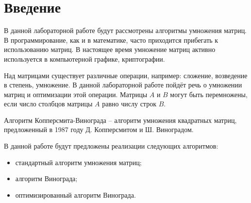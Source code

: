 \chapter*{Введение}

В данной лабораторной работе будут рассмотрены алгоритмы умножения матриц.
В программирование, как и в математике, часто приходится прибегать к использованию матриц.
В настоящее время умножение матриц активно используется в компьютерной графике, криптографии.

Над матрицами существует различные операции, например: сложение, возведение в степень, умножение.
В данной лабораторной работе пойдёт речь о умножении матриц и оптимизации этой операции.
Матрицы $A$ и $B$ могут быть перемножены, если число столбцов матрицы $A$ равно числу строк $B$.

Алгоритм Копперсмита-Винограда -- алгоритм умножения квадратных матриц, предложенный в 1987 году Д. Копперсмитом и Ш. Виноградом.

В данной работе будут предложены реализации следующих алгоритмов:
\begin{itemize}
	\item стандартный алгоритм умножения матриц;
	\item алгоритм Винограда;
	\item оптимизированный алгоритм Винограда.
\end{itemize}
